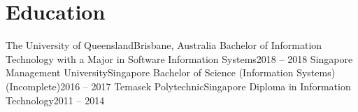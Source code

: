 \section{Education}
\resumeSubHeadingListStart
\resumeSubheading
{The University of Queensland}{Brisbane, Australia}
{Bachelor of Information Technology with a Major in Software Information Systems}{2018 -- 2018}
\resumeSubheading
{Singapore Management University}{Singapore}
{Bachelor of Science (Information Systems) (Incomplete)}{2016 -- 2017}
\resumeSubheading
{Temasek Polytechnic}{Singapore}
{Diploma in Information Technology}{2011 -- 2014}
\resumeSubHeadingListEnd